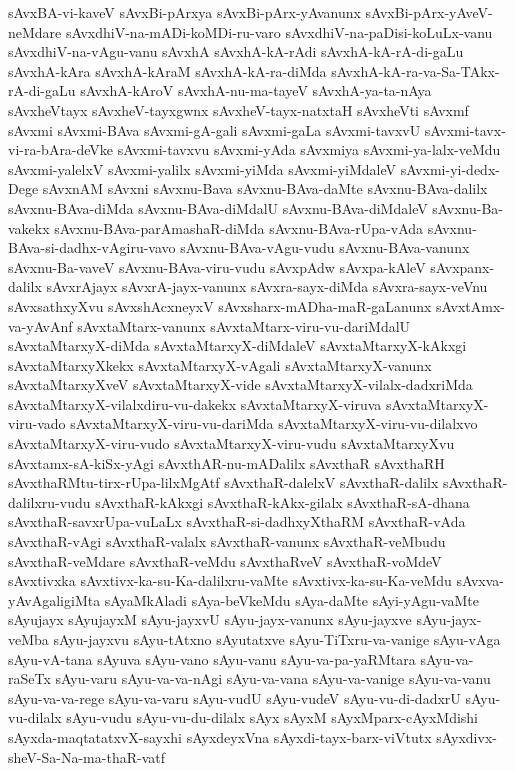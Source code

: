 {sAvxBA-vi-kaveV
sAvxBi-pArxya
sAvxBi-pArx-yAvanunx
sAvxBi-pArx-yAveV-neMdare
sAvxdhiV-na-mADi-koMDi-ru-varo
sAvxdhiV-na-paDisi-koLuLx-vanu
sAvxdhiV-na-vAgu-vanu
sAvxhA
sAvxhA-kA-rAdi
sAvxhA-kA-rA-di-gaLu
sAvxhA-kAra
sAvxhA-kAraM
sAvxhA-kA-ra-diMda
sAvxhA-kA-ra-va-Sa-TAkx-rA-di-gaLu
sAvxhA-kAroV
sAvxhA-nu-ma-tayeV
sAvxhA-ya-ta-nAya
sAvxheVtayx
sAvxheV-tayxgwnx
sAvxheV-tayx-natxtaH
sAvxheVti
sAvxmf
sAvxmi
sAvxmi-BAva
sAvxmi-gA-gali
sAvxmi-gaLa
sAvxmi-tavxvU
sAvxmi-tavx-vi-ra-bAra-deVke
sAvxmi-tavxvu
sAvxmi-yAda
sAvxmiya
sAvxmi-ya-lalx-veMdu
sAvxmi-yalelxV
sAvxmi-yalilx
sAvxmi-yiMda
sAvxmi-yiMdaleV
sAvxmi-yi-dedx-Dege
sAvxnAM
sAvxni
sAvxnu-Bava
sAvxnu-BAva-daMte
sAvxnu-BAva-dalilx
sAvxnu-BAva-diMda
sAvxnu-BAva-diMdalU
sAvxnu-BAva-diMdaleV
sAvxnu-Ba-vakekx
sAvxnu-BAva-parAmashaR-diMda
sAvxnu-BAva-rUpa-vAda
sAvxnu-BAva-si-dadhx-vAgiru-vavo
sAvxnu-BAva-vAgu-vudu
sAvxnu-BAva-vanunx
sAvxnu-Ba-vaveV
sAvxnu-BAva-viru-vudu
sAvxpAdw
sAvxpa-kAleV
sAvxpanx-dalilx
sAvxrAjayx
sAvxrA-jayx-vanunx
sAvxra-sayx-diMda
sAvxra-sayx-veVnu
sAvxsathxyXvu
sAvxshAcxneyxV
sAvxsharx-mADha-maR-gaLanunx
sAvxtAmx-va-yAvAnf
sAvxtaMtarx-vanunx
sAvxtaMtarx-viru-vu-dariMdalU
sAvxtaMtarxyX-diMda
sAvxtaMtarxyX-diMdaleV
sAvxtaMtarxyX-kAkxgi
sAvxtaMtarxyXkekx
sAvxtaMtarxyX-vAgali
sAvxtaMtarxyX-vanunx
sAvxtaMtarxyXveV
sAvxtaMtarxyX-vide
sAvxtaMtarxyX-vilalx-dadxriMda
sAvxtaMtarxyX-vilalxdiru-vu-dakekx
sAvxtaMtarxyX-viruva
sAvxtaMtarxyX-viru-vado
sAvxtaMtarxyX-viru-vu-dariMda
sAvxtaMtarxyX-viru-vu-dilalxvo
sAvxtaMtarxyX-viru-vudo
sAvxtaMtarxyX-viru-vudu
sAvxtaMtarxyXvu
sAvxtamx-sA-kiSx-yAgi
sAvxthAR-nu-mADalilx
sAvxthaR
sAvxthaRH
sAvxthaRMtu-tirx-rUpa-lilxMgAtf
sAvxthaR-dalelxV
sAvxthaR-dalilx
sAvxthaR-dalilxru-vudu
sAvxthaR-kAkxgi
sAvxthaR-kAkx-gilalx
sAvxthaR-sA-dhana
sAvxthaR-savxrUpa-vuLaLx
sAvxthaR-si-dadhxyXthaRM
sAvxthaR-vAda
sAvxthaR-vAgi
sAvxthaR-valalx
sAvxthaR-vanunx
sAvxthaR-veMbudu
sAvxthaR-veMdare
sAvxthaR-veMdu
sAvxthaRveV
sAvxthaR-voMdeV
sAvxtivxka
sAvxtivx-ka-su-Ka-dalilxru-vaMte
sAvxtivx-ka-su-Ka-veMdu
sAvxva-yAvAgaligiMta
sAyaMkAladi
sAya-beVkeMdu
sAya-daMte
sAyi-yAgu-vaMte
sAyujayx
sAyujayxM
sAyu-jayxvU
sAyu-jayx-vanunx
sAyu-jayxve
sAyu-jayx-veMba
sAyu-jayxvu
sAyu-tAtxno
sAyutatxve
sAyu-TiTxru-va-vanige
sAyu-vAga
sAyu-vA-tana
sAyuva
sAyu-vano
sAyu-vanu
sAyu-va-pa-yaRMtara
sAyu-va-raSeTx
sAyu-varu
sAyu-va-va-nAgi
sAyu-va-vana
sAyu-va-vanige
sAyu-va-vanu
sAyu-va-va-rege
sAyu-va-varu
sAyu-vudU
sAyu-vudeV
sAyu-vu-di-dadxrU
sAyu-vu-dilalx
sAyu-vudu
sAyu-vu-du-dilalx
sAyx
sAyxM
sAyxMparx-cAyxMdishi
sAyxda-maqtatatxvX-sayxhi
sAyxdeyxVna
sAyxdi-tayx-barx-viVtutx
sAyxdivx-sheV-Sa-Na-ma-thaR-vatf
}
